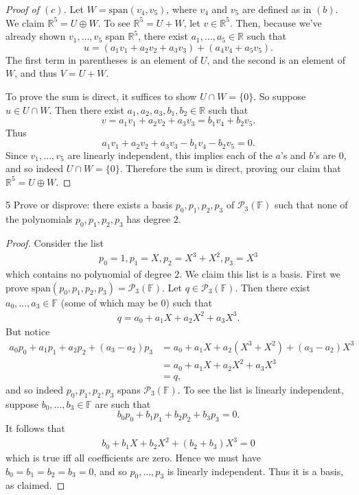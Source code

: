 \documentclass[11pt]{extarticle}
\newenvironment{problem}[1]{\begin{prob*}{#1}{}}{\end{prob*}}
\newcommand{\R}{\mathbb{R}}
\newcommand{\F}{\mathbb{F}}
\newcommand{\Span}{\mathrm{span}}
\begin{document}
\begin{proof}[Proof of $(c)$]
Let $W = \Span(v_4, v_5)$, where $v_4$ and $v_5$ are defined as in $(b)$.  We claim $\R^5 = U\oplus W$.  To see $\R^5 = U + W$, let $v\in\R^5$.  Then, because we've already shown $v_1,\dots, v_5$ span $\R^5$, there exist $a_1,\dots, a_5\in\R$ such that 
\begin{equation*}
u = (a_1v_1 + a_2v_2 + a_3v_3) + (a_4v_4 + a_5v_5).
\end{equation*}
The first term in parentheses is an element of $U$, and the second is an element of $W$, and thus $V=U+W$.
\par To prove the sum is direct, it suffices to show $U\cap W = \{0\}$.  So suppose $u\in U\cap W$.  Then there exist $a_1,a_2,a_3,b_1,b_2\in\R$ such that 
\begin{equation*}
v = a_1v_1 + a_2v_2 + a_3v_3 = b_1v_4 + b_2v_5.
\end{equation*}
Thus
\begin{equation*}
a_1v_1 + a_2v_2 + a_3v_3 - b_1v_4 - b_2v_5 = 0.
\end{equation*}
Since $v_1,\dots,v_5$ are linearly independent, this implies each of the $a$'s and $b$'s are $0$, and so indeed $U\cap W = \{0\}$.  Therefore the sum is direct, proving our claim that $\R^5 = U\oplus W$.
\end{proof}

\begin{problem}{5}
Prove or disprove: there exists a basis $p_0, p_1,p_2,p_3$ of $\mathcal{P}_3(\F)$ such that none of the polynomials $p_0,p_1,p_2,p_3$ has degree $2$.
\end{problem}
\begin{proof}
Consider the list
\begin{align*}
p_0 = 1, p_1 = X, p_2 = X^3 + X^2, p_3 = X^3
\end{align*}
which contains no polynomial of degree $2$.  We claim this list is a basis.  First we prove $\Span(p_0, p_1,p_2,p_3) = \mathcal{P}_3(\F)$.  Let $q\in\mathcal{P}_3(\F)$.  Then there exist $a_0,\dots, a_3\in\F$ (some of which may be $0$) such that
\begin{align*}
q = a_0 + a_1X + a_2X^2 + a_3X^3.
\end{align*}
But notice
\begin{align*}
a_0p_0 + a_1p_1 + a_2p_2 + (a_3-a_2)p_3  &= a_0 + a_1X + a_2(X^3 + X^2) + (a_3-a_2)X^3\\
&= a_0 + a_1X + a_2X^2 + a_3X^3\\
&= q,
\end{align*}
and so indeed $p_0,p_1,p_2,p_3$ spans $\mathcal{P}_3(\F)$.  To see the list is linearly independent, suppose $b_0,\dots,b_3\in\F$ are such that
\begin{equation*}
b_0p_0 + b_1p_1 + b_2p_2 + b_3p_3 = 0.
\end{equation*}
It follows that
\begin{align*}
b_0 + b_1X + b_2X^2 + (b_2 + b_3)X^3 = 0 
\end{align*}
which is true iff all coefficients are zero.  Hence we must have $b_0=b_1=b_2=b_3=0$, and so $p_0,\dots,p_3$ is linearly independent.  Thus it is a basis, as claimed.
\end{proof}
\end{document}
